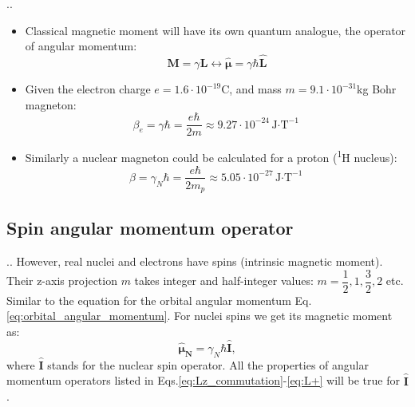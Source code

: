\documentclass[handout]{beamer}
\begin{document}
\begin{frame}{\thesection.\thesubsection. \insertsubsection}
	\begin{itemize}[<+>]
		\item
			Classical magnetic moment will have its own quantum analogue, the operator of angular momentum:
			\begin{equation}\label{eq:orbital_angular_momentum}
			\bm{M} = \gamma \bm{L}  \longleftrightarrow \bm{\hat{\mu}} = \gamma \hbar \bm{\hat{L}}
			\end{equation} 
		\item Given the electron charge $e= 1.6 \cdot 10^{-19}$C, and mass $m = 9.1 \cdot 10^{-31}$kg   \alert{Bohr magneton}:
		\begin{equation}
			\beta_e = \gamma \hbar = \dfrac{e\hbar}{2m} \approx 9.27 \cdot 10^{-24}  \text{J$\cdot$T}^{-1}
		\end{equation}
		\item Similarly a \alert{nuclear magneton} could be calculated for a proton (\textsuperscript{1}H nucleus):
		\begin{equation}
		\beta = \gamma_N \hbar = \dfrac{e\hbar}{2m_p} \approx 5.05 \cdot 10^{-27}  \text{J$\cdot$T}^{-1}
		\end{equation}
		
	\end{itemize}

\end{frame}

\subsection{Spin angular momentum operator}
\begin{frame}{\thesection.\thesubsection. \insertsubsection}
	However, real nuclei and electrons have spins (intrinsic magnetic moment). Their z-axis projection $m$ takes integer and half-integer values: $m=\dfrac{1}{2}, 1, \dfrac{3}{2}, 2$ etc. Similar to the equation for the orbital angular momentum Eq.\ref{eq:orbital_angular_momentum}. For nuclei spins we get its magnetic moment as:
	\begin{equation}
		\bm{\hat{\mu}_N} = \gamma_N \hbar \bm{\hat{I}},
	\end{equation}
	where $ \bm{\hat{I}}$ stands for the nuclear spin operator. All the properties of angular momentum operators listed in Eqs.\ref{eq:Lz_commutation}-\ref*{eq:L+} will be true for $ \bm{\hat{I}}$.
\end{frame}
\end{document}
